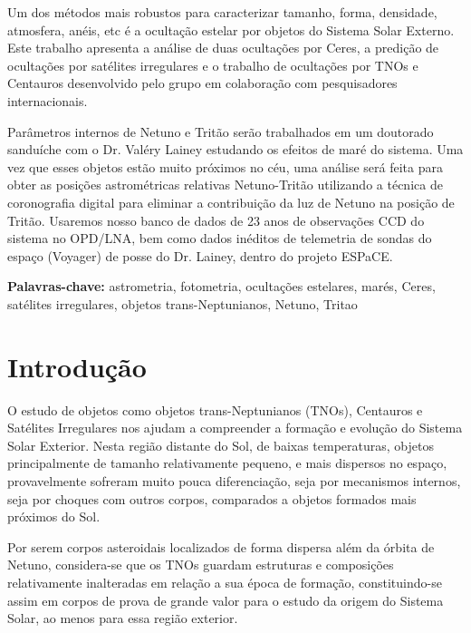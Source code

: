 \documentclass[12pt,a4paper]{monografia}
\begin{document}
Um dos métodos mais robustos para caracterizar tamanho, forma, densidade, atmosfera, anéis, etc é a ocultação estelar por objetos do Sistema Solar Externo. Este trabalho apresenta a análise de duas ocultações por Ceres, a predição de ocultações por satélites irregulares e o trabalho de ocultações por TNOs e Centauros desenvolvido pelo grupo em colaboração com pesquisadores internacionais.

Parâmetros internos de Netuno e Tritão serão trabalhados em um doutorado sanduíche com o Dr. Valéry Lainey estudando os efeitos de maré do sistema. Uma vez que esses objetos estão muito próximos no céu, uma análise será feita para obter as posições astrométricas relativas Netuno-Tritão utilizando a técnica de coronografia digital para eliminar a contribuição da luz de Netuno na posição de Tritão. Usaremos nosso banco de dados de 23 anos de observações CCD do sistema no OPD/LNA, bem como dados inéditos de telemetria de sondas do espaço (Voyager) de posse do Dr. Lainey, dentro do projeto ESPaCE.

\par
\vspace{1em}
\noindent\textbf{Palavras-chave:} astrometria, fotometria, ocultações estelares, marés, Ceres, satélites irregulares, objetos trans-Neptunianos, Netuno, Tritao


\tableofcontents %
\thispagestyle{empty} %

\pagestyle{ruledheader}

\chapter{Introdução}
\label{Cap: intro}

\indent \indent O estudo de objetos como objetos trans-Neptunianos (TNOs), Centauros e Satélites Irregulares nos ajudam a compreender a formação e evolução do Sistema Solar Exterior. Nesta região distante do Sol, de baixas temperaturas, objetos principalmente de tamanho relativamente pequeno, e mais dispersos no espaço, provavelmente sofreram muito pouca diferenciação, seja por mecanismos internos, seja por choques com outros corpos, comparados a objetos formados mais próximos do Sol.

Por serem corpos asteroidais localizados de forma dispersa além da órbita de Netuno, considera-se que os TNOs guardam estruturas e composições relativamente inalteradas em relação a sua época de formação, constituindo-se assim em corpos de prova de grande valor para o estudo da origem do Sistema Solar, ao menos para essa região exterior.
\end{document}
